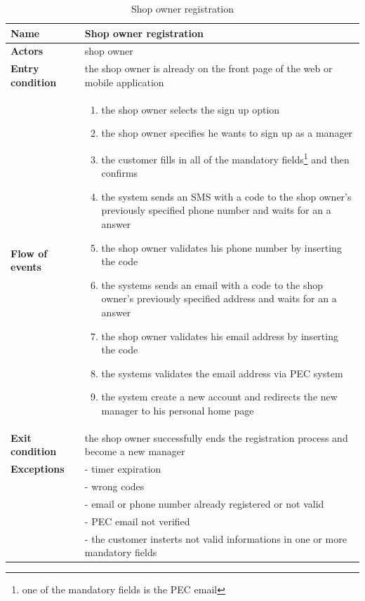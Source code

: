 \begin{table}[h!]
    \centering
    \begin{tabular}{@{}P{0.2\textwidth}P{0.70\textwidth}@{}}
        \toprule
        \textbf{Name}                 & Shop owner registration\\
        \midrule
        \textbf{Actors}               & shop owner\\
        \textbf{Entry condition}      & the shop owner is already on the front page of the web or mobile application\\
        \textbf{Flow of events}       & 
        \begin{enumerate}[nolistsep, leftmargin=*]
            \item the shop owner selects the sign up option
            \item the shop owner specifies he wants to sign up as a manager
            \item the customer fills in all of the mandatory fields\footnote{one of the mandatory fields is the PEC email} and then confirms
            \item the system sends an SMS with a code to the shop owner's previously specified phone number and waits for an a answer
            \item the shop owner validates his phone number by inserting the code
            \item the systems sends an email with a code to the shop owner's previously specified address and waits for an a answer
            \item the shop owner validates his email address by inserting the code
            \item the systems validates the email address via PEC system
            \item the system create a new account and redirects the new manager to his personal home page
        \end{enumerate} \\
        \textbf{Exit condition}       & the shop owner successfully ends the registration process and become a new manager\\
        \textbf{Exceptions}           
        & - timer expiration\\
        & - wrong codes\\
        & - email or phone number already registered or not valid\\
        & - PEC email not verified\\
        & - the customer insterts not valid informations in one or more mandatory fields\\
        \bottomrule
    \end{tabular}
\caption{Shop owner registration}
\label{table:shopownerregistration}
\end{table}

